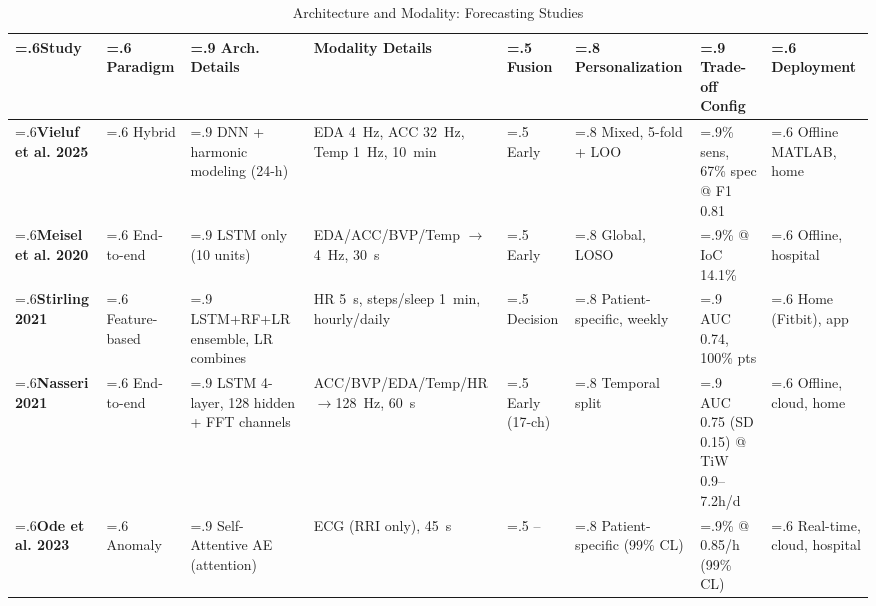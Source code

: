 
\begin{landscape}
\begin{table}[htbp]
\centering
\scriptsize
\caption{Architecture and Modality: Forecasting Studies}
\label{tab:forecasting-architecture}
\setlength{\tabcolsep}{2.5pt}
\renewcommand{\arraystretch}{1.15}
\begin{tabularx}{\linewidth}{@{} >{\hsize=.6\hsize}X >{\hsize=.6\hsize}X >{\hsize=.9\hsize}X >{\hsize=1.1\hsize}X >{\hsize=.5\hsize}X >{\hsize=.8\hsize}X >{\hsize=.9\hsize}X >{\hsize=.6\hsize}X @{}}
\toprule
\textbf{Study} & \textbf{Paradigm} & \textbf{Arch. Details} & \textbf{Modality Details} & \textbf{Fusion} & \textbf{Personalization} & \textbf{Trade-off Config} & \textbf{Deployment} \\
\midrule
\textbf{Vieluf et al. 2025} & Hybrid & DNN + harmonic modeling (24-h) & EDA 4~Hz, ACC 32~Hz, Temp 1~Hz, 10~min & Early & Mixed, 5-fold + LOO & 82\% sens, 67\% spec @ F1 0.81 & Offline MATLAB, home \\
\textbf{Meisel et al. 2020} & End-to-end & LSTM only (10 units) & EDA/ACC/BVP/Temp $\to$4~Hz, 30~s & Early & Global, LOSO & 51.2\% @ IoC 14.1\% & Offline, hospital \\
\textbf{Stirling 2021} & Feature-based & LSTM+RF+LR ensemble, LR combines & HR 5~s, steps/sleep 1~min, hourly/daily & Decision & Patient-specific, weekly & AUC 0.74, 100\% pts & Home (Fitbit), app \\
\textbf{Nasseri 2021} & End-to-end & LSTM 4-layer, 128 hidden + FFT channels & ACC/BVP/EDA/Temp/HR $\to$128~Hz, 60~s & Early (17-ch) & Temporal split & AUC 0.75 (SD 0.15) @ TiW 0.9--7.2h/d & Offline, cloud, home \\
\textbf{Ode et al. 2023} & Anomaly & Self-Attentive AE (attention) & ECG (RRI only), 45~s & -- & Patient-specific (99\% CL) & 74\% @ 0.85/h (99\% CL) & Real-time, cloud, hospital \\
\bottomrule
\end{tabularx}
\par\medskip
\tiny

\end{table}
\end{landscape}
